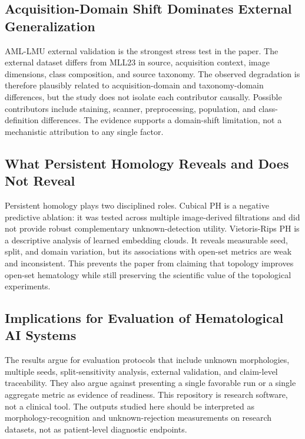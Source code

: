 \subsection{Acquisition-Domain Shift Dominates External Generalization}

AML-LMU external validation is the strongest stress test in the paper. The external dataset differs from MLL23 in source, acquisition context, image dimensions, class composition, and source taxonomy. The observed degradation is therefore plausibly related to acquisition-domain and taxonomy-domain differences, but the study does not isolate each contributor causally. Possible contributors include staining, scanner, preprocessing, population, and class-definition differences. The evidence supports a domain-shift limitation, not a mechanistic attribution to any single factor.

\subsection{What Persistent Homology Reveals and Does Not Reveal}

Persistent homology plays two disciplined roles. Cubical PH is a negative predictive ablation: it was tested across multiple image-derived filtrations and did not provide robust complementary unknown-detection utility. Vietoris-Rips PH is a descriptive analysis of learned embedding clouds. It reveals measurable seed, split, and domain variation, but its associations with open-set metrics are weak and inconsistent. This prevents the paper from claiming that topology improves open-set hematology while still preserving the scientific value of the topological experiments.

\subsection{Implications for Evaluation of Hematological AI Systems}

The results argue for evaluation protocols that include unknown morphologies, multiple seeds, split-sensitivity analysis, external validation, and claim-level traceability. They also argue against presenting a single favorable run or a single aggregate metric as evidence of readiness. This repository is research software, not a clinical tool. The outputs studied here should be interpreted as morphology-recognition and unknown-rejection measurements on research datasets, not as patient-level diagnostic endpoints.


